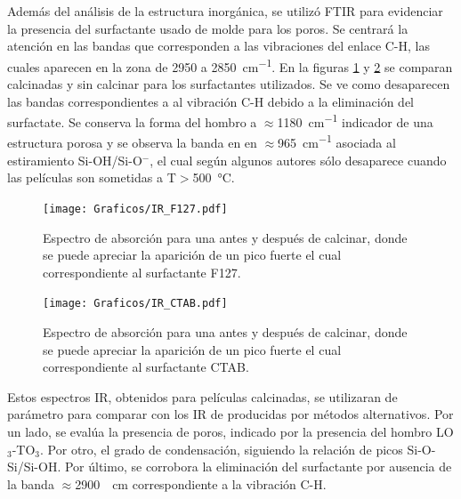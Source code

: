 		 Además del análisis de la estructura inorgánica, se utilizó FTIR para evidenciar la presencia del surfactante usado de molde para los poros. Se centrará la atención en las bandas que corresponden a las vibraciones del enlace C-H, las cuales aparecen en la zona de 2950 a \SI{2850}{\cm^{-1}}. En la figuras \ref{fig:IR_F127_calciando} y \ref{fig:IR_CTAB_calcinado} se comparan \pdm\space calcinadas y sin calcinar para los surfactantes utilizados. Se ve como desaparecen las bandas correspondientes a al vibración C-H debido a la eliminación del surfactate. Se conserva la forma del hombro a $\approx$\SI{1180}{\cm^{-1}} indicador de una estructura porosa y se observa la banda en en $\approx$\SI{965}{\cm^{-1}} asociada al estiramiento Si-OH/Si-O$^-$, el cual según algunos autores sólo desaparece cuando las películas son sometidas a T$>$\SI{500}{\celsius}.\cite{Innocenzi2003,Almeida1990,Bertoluzza1982}

				\begin{figure}[!ht]
						\begin{center}
						\texttt{[image: Graficos/IR\_F127.pdf]}
						\caption[FTIR para una \pdmF.]{Espectro de absorción para una \pdmF\space antes y después de calcinar, donde se puede apreciar la aparición de un pico fuerte el cual correspondiente al surfactante F127.}
						\label{fig:IR_F127_calciando}
						\end{center}
						\end{figure}
				
				\begin{figure}[!ht]
						\begin{center}
						\texttt{[image: Graficos/IR\_CTAB.pdf]}
						\caption[FTIR para una \pdmC.]{Espectro de absorción para una \pdmC\space antes y después de calcinar, donde se puede apreciar la aparición de un pico fuerte el cual correspondiente al surfactante CTAB.}
						\label{fig:IR_CTAB_calcinado}
						\end{center}
						\end{figure}		
		 
		 Estos espectros IR, obtenidos para películas calcinadas, se utilizaran de parámetro para comparar con los IR de \pdm\space producidas por métodos alternativos. Por un lado, se evalúa la presencia de poros, indicado por la presencia del hombro LO$_3$-TO$_3$. Por otro, el grado de condensación, siguiendo la relación de picos Si-O-Si/Si-OH. Por último, se corrobora la eliminación del surfactante por ausencia de la banda $\approx$\SI{2900}{\per\cm} correspondiente a la vibración C-H.

